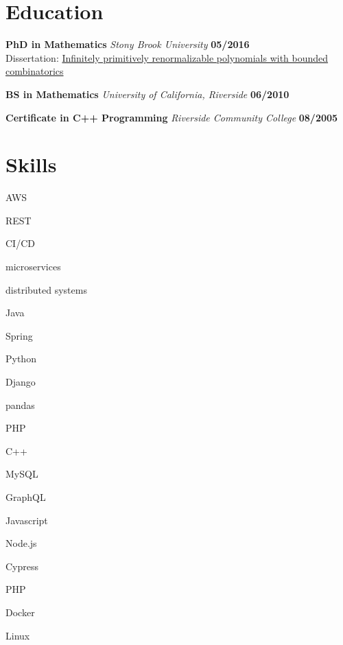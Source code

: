 \documentclass[12pt]{article}
\newcommand\verticalspace{\vspace{0.5cm}}
\begin{document}
\section*{Education}
\textbf{PhD in Mathematics} \emph{Stony Brook University} \hfill \textbf{05/2016}\\
Dissertation: \href{http://hdl.handle.net/11401/76376}{Infinitely primitively renormalizable polynomials with bounded combinatorics}

\verticalspace

\textbf{BS in Mathematics} \emph{University of California, Riverside} \hfill \textbf{06/2010}

\verticalspace

\textbf{Certificate in C++ Programming} \emph{Riverside Community College} \hfill \textbf{08/2005}

\section*{Skills}
\begin{inparaitem}
  \item AWS
  \item REST
  \item CI/CD
  \item microservices
  \item distributed systems
  \item Java
  \item Spring
  \item Python
  \item Django
  \item pandas
  \item PHP
  \item C++
  \item MySQL
  \item GraphQL
  \item Javascript
  \item Node.js
  \item Cypress
  \item PHP
  \item Docker
  \item Linux
\end{inparaitem}
\end{document}
